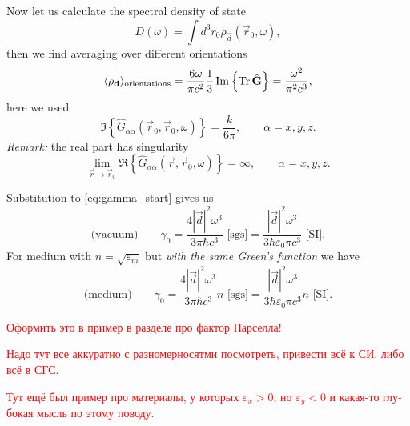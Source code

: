 Now let us calculate the spectral density of state
\begin{equation}
	D(\omega) = \int d^3 r_0 \rho_{\vec{d}} (\vec{r}_0, \omega),
\end{equation}
then we find averaging over different orientations
\begin{equation}
	\langle \rho_{\mathbf{d}} \rangle_{\text{orientations}} = \frac{6 \omega}{\pi c^2} \frac{1}{3} \operatorname{Im} \left\{ \operatorname{Tr} \hat{\mathbf{G}} \right\} = \frac{\omega^2}{\pi^2 c^3},
\end{equation}
here we used
\begin{equation}
	\Im \left\{ \hat{G}_{\alpha \alpha} (\vec{r}_0, \vec{r}_0, \omega) \right\} = \frac{k}{6 \pi}, \qquad \alpha = x,y,z.
\end{equation}
\textit{Remark:} the real part has singularity
\begin{equation}
	\lim\limits_{\vec{r}\to \vec{r}_0}\Re \left\{ \hat{G}_{\alpha \alpha} (\vec{r}, \vec{r}_0, \omega) \right\}  = \infty,  \qquad \alpha = x,y,z.
\end{equation}

Substitution to \eqref{eq:gamma_start} gives us
\begin{equation}
	\text{(vacuum)} \qquad \gamma_0 = \frac{4 |\vec{d}|^2 \omega^3}{3 \pi \hbar c^3}  \text{ [sgs]} = \frac{|\vec{d}|^2 \omega^3}{3 \hbar \varepsilon_0 \pi c^3} \text{ [SI]}.
\end{equation}
For medium with $n = \sqrt{\varepsilon_m}$ but \textit{with the same Green's function} we have
\begin{equation}
\text{(medium)} \qquad \gamma_0 = \frac{4 |\vec{d}|^2 \omega^3}{3 \pi \hbar c^3}n  \text{ [sgs]} = \frac{|\vec{d}|^2 \omega^3}{3 \hbar \varepsilon_0 \pi c^3}n \text{ [SI]}.
\end{equation}
\begin{otherlanguage}{russian}	
	\textcolor{red}{Оформить это в пример в разделе про фактор Парселла!}
\end{otherlanguage}

\begin{otherlanguage}{russian}	
	\textcolor{red}{Надо тут все аккуратно с разномерносятми посмотреть, привести всё к СИ, либо всё в СГС.}
\end{otherlanguage}

\begin{otherlanguage}{russian}	
	\textcolor{red}{Тут ещё был пример про материалы, у которых $\varepsilon_x>0$, но $\varepsilon_y<0$ и какая-то глубокая мысль по этому поводу.}
\end{otherlanguage}

